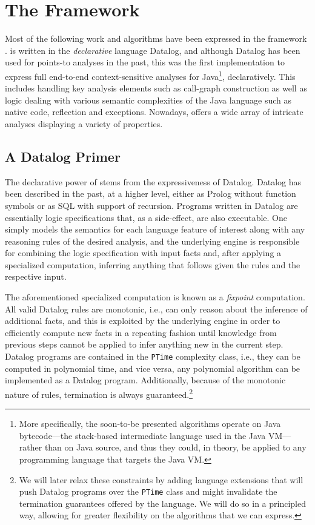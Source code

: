 \section{The \doop{} Framework}

Most of the following work and algorithms have been expressed in the \doop{} framework \cite{oopsla:2009:Bravenboer}. \doop{} is written in the \emph{declarative} language Datalog, and although Datalog has been used for points-to analyses in the past, this was the first implementation to express full end-to-end context-sensitive analyses for Java\footnote{More specifically, the soon-to-be presented algorithms operate on Java bytecode---the stack-based intermediate language used in the Java VM---rather than on Java source, and thus they could, in theory, be applied to any programming language that targets the Java VM.}, declaratively. This includes handling key analysis elements such as call-graph construction as well as logic dealing with various semantic complexities of the Java language such as native code, reflection and exceptions. Nowadays, \doop{} offers a wide array of intricate analyses displaying a variety of properties.

\subsection*{A Datalog Primer}
\label{sec:intro:datalog}

The declarative power of \doop{} stems from the expressiveness of Datalog. Datalog has been described in the past, at a higher level, either as Prolog without function symbols or as SQL with support of recursion. Programs written in Datalog are essentially logic specifications that, as a side-effect, are also executable. One simply models the semantics for each language feature of interest along with any reasoning rules of the desired analysis, and the underlying engine is responsible for combining the logic specification with input facts and, after applying a specialized computation, inferring anything that follows given the rules and the respective input.

The aforementioned specialized computation is known as a \emph{fixpoint} computation. All valid Datalog rules are monotonic, i.e., can only reason about the inference of additional facts, and this is exploited by the underlying engine in order to efficiently compute new facts in a repeating fashion until knowledge from previous steps cannot be applied to infer anything new in the current step. Datalog programs are contained in the \texttt{PTime} complexity class, i.e., they can be computed in polynomial time, and vice versa, any polynomial algorithm can be implemented as a Datalog program. Additionally, because of the monotonic nature of rules, termination is always guaranteed.\footnote{We will later relax these constraints by adding language extensions that will push Datalog programs over the \texttt{PTime} class and might invalidate the termination guarantees offered by the language. We will do so in a principled way, allowing for greater flexibility on the algorithms that we can express.}

